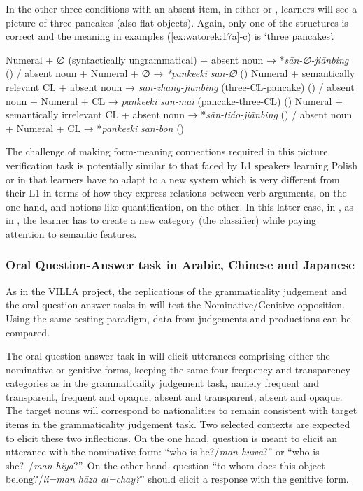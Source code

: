 \documentclass[output=paper,colorlinks,citecolor=brown,modfonts,nonflat]{../langscibook}
\begin{document}
In the other three conditions with an absent item, in either  or , learners will see a picture of three pancakes (also flat objects). Again, only one of the structures is correct  and the meaning in examples (\ref{ex:watorek:17a}-c) is ‘three pancakes’.

\ea%
    \label{ex:watorek:17}
    \ea%
    \label{ex:watorek:17a}
    Numeral + ∅ (syntactically ungrammatical) + absent noun → *\textit{sān-∅-jiānbing} () / absent noun + Numeral + ∅ → \textit{*pankeeki} \textit{san-∅} ()
    \ex%
    \label{ex:watorek:17b}
    Numeral + semantically relevant CL + absent noun → \textit{sān-zhāng-jiānbing} (three-CL-pancake) () / absent noun + Numeral + CL → \textit{pankeeki} \textit{san-mai} (pancake-three-CL) ()
    \ex%
    \label{ex:watorek:17c}
    Numeral + semantically irrelevant CL + absent noun → *\textit{sān-tiáo-jiānbing} () / absent noun + Numeral + CL → *\textit{pankeeki} \textit{san-bon} ()
    \z
\z

The challenge of making form-meaning connections required in this picture verification task is potentially similar to that faced by L1  speakers learning Polish or  in that learners have to adapt to a new system which is very different from their L1 in terms of how they express relations between verb arguments, on the one hand, and notions like quantification, on the other. In this latter case, in , as in , the  learner has to create a new category (the classifier) while paying attention to semantic features. 

\subsubsection{Oral Question-Answer task in Arabic, Chinese and Japanese}\label{sec:watorek:4.2.3}

\label{sec:watorek:4.2.3.1}

As in the VILLA project, the replications of the grammaticality judgement and the oral question-answer tasks in  will test the Nominative/Genitive opposition. Using the same testing paradigm, data from judgements and productions can be compared.

The oral question-answer task in  will elicit utterances comprising either the nominative or genitive forms, keeping the same four frequency and transparency categories as in the grammaticality judgement task, namely frequent and transparent, frequent and opaque, absent and transparent, absent and opaque. The target nouns will correspond to nationalities to remain consistent with target items in the grammaticality judgement task. Two selected contexts are expected to elicit these two inflections. On the one hand, question  is meant to elicit an utterance with the nominative form: “who is he?\slash \textit{man huwa}?”  or “who is she?~/\textit{man hiya}?”. On the other hand, question  “to whom does this object belong?\slash \textit{li=man hāza al=chay?}” should elicit a response with the genitive form.
\end{document}

